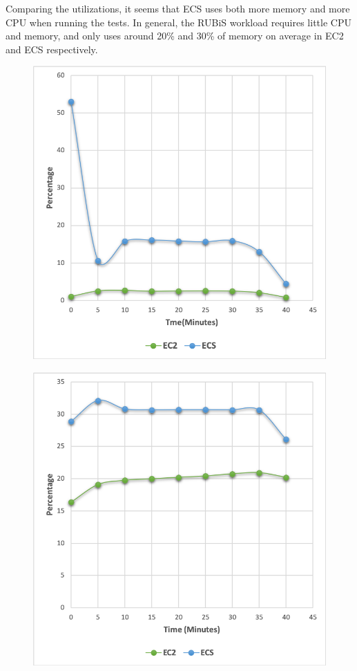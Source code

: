 \documentclass[11pt]{article}
\begin{document}
Comparing the utilizations, it seems that ECS uses both more memory and more CPU when running the tests. In general, the RUBiS workload requires little CPU and memory, and only uses around 20\% and 30\% of memory on average in EC2 and ECS respectively.

\begin{figure}
\centering
\begin{minipage}{.5\textwidth}
  \centering
  \includegraphics[scale=0.4]{CPU_rubis}
  \label{ECS-CPU}
\end{minipage}%
\begin{minipage}{.5\textwidth}
  \centering
  \includegraphics[scale=0.4]{Memory_rubis}
  \label{fig:test2}
\end{minipage}
\end{figure}
\end{document}
